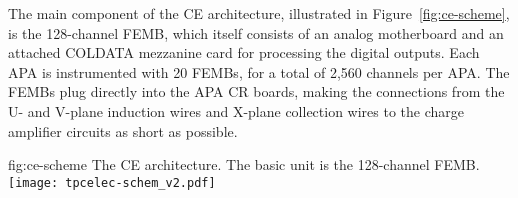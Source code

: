 The main component of the CE architecture, illustrated in Figure~\ref{fig:ce-scheme}, is the 
128-channel FEMB, which itself consists of an analog motherboard and an attached COLDATA 
mezzanine card for processing the digital outputs.
Each APA is instrumented with 20 FEMBs, for a total of 2,560 channels per APA.
The FEMBs plug directly into the APA CR boards, making the connections from the U- and V-plane induction wires and 
X-plane collection wires to the charge amplifier circuits as short as possible.

\begin{dunefigure}
{fig:ce-scheme}
{The CE architecture. The basic unit is the 128-channel FEMB.}
\texttt{[image: tpcelec-schem\_v2.pdf]}
\end{dunefigure}
